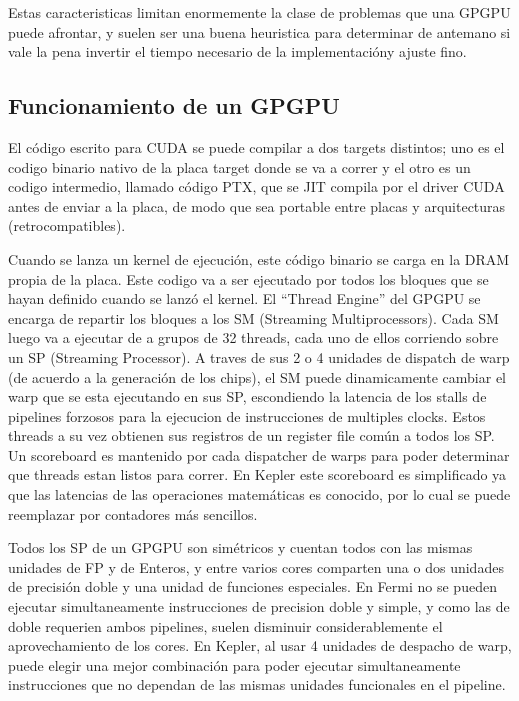 Estas caracteristicas limitan enormemente la clase de problemas que una GPGPU puede
afrontar, y suelen ser una buena heuristica para determinar de antemano si vale la pena
invertir el tiempo necesario de la implementaci\'ony ajuste fino.

\subsection{Funcionamiento de un GPGPU}

El c\'odigo escrito para CUDA se puede compilar a dos targets distintos; uno es
el codigo binario nativo de la placa target donde se va a correr y el otro es un
codigo intermedio, llamado c\'odigo PTX, que se JIT compila por el driver CUDA
antes de enviar a la placa, de modo que sea portable entre placas y arquitecturas
(retrocompatibles).

Cuando se lanza un kernel de ejecuci\'on, este c\'odigo binario se carga en la DRAM propia
de la placa. Este codigo va a ser ejecutado por todos los bloques que se hayan definido cuando
se lanz\'o el kernel. El ``Thread Engine'' del GPGPU se encarga de repartir los bloques a los
SM (Streaming Multiprocessors). Cada SM luego va a ejecutar de a grupos de 32 threads, cada uno
de ellos corriendo sobre un SP (Streaming Processor). A traves de sus 2 o 4 unidades de dispatch de warp
(de acuerdo a la generaci\'on de los chips), el SM puede dinamicamente cambiar el warp que se esta ejecutando en sus SP,
escondiendo la latencia de los stalls de pipelines forzosos para la ejecucion de instrucciones de multiples clocks.
Estos threads a su vez obtienen sus registros de un register file com\'un a todos los SP. Un scoreboard
es mantenido por cada dispatcher de warps para poder determinar que threads estan listos para correr. En Kepler
este scoreboard es simplificado ya que las latencias de las operaciones matem\'aticas es conocido, por
lo cual se puede reemplazar por contadores m\'as sencillos. ~\cite{NvidiaKepler}

Todos los SP de un GPGPU son sim\'etricos y cuentan todos con las mismas unidades de FP y de Enteros,
y entre varios cores comparten una o dos unidades de precisi\'on doble y una unidad de funciones especiales.
En Fermi no se pueden ejecutar simultaneamente instrucciones de precision doble y simple, y como
las de doble requerien ambos pipelines, suelen disminuir considerablemente el aprovechamiento
de los cores. En Kepler, al usar 4 unidades de despacho de warp, puede elegir una mejor
combinaci\'on para poder ejecutar simultaneamente instrucciones que no dependan de las mismas
unidades funcionales en el pipeline. ~\cite{NvidiaKepler}

